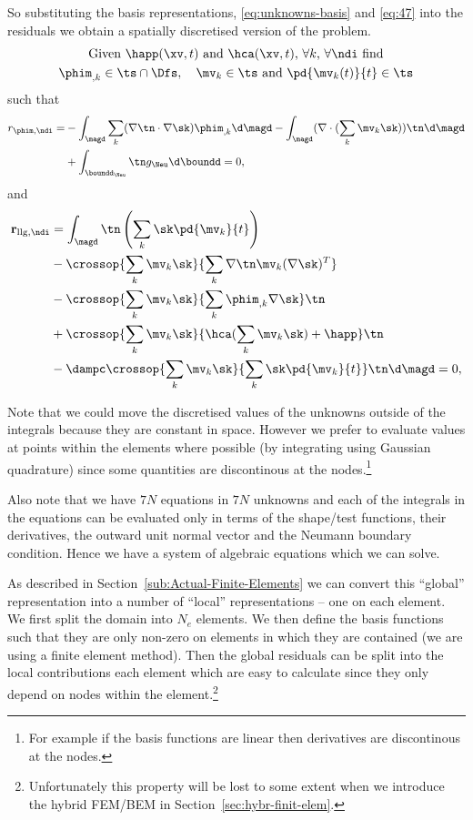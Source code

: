 So substituting the basis representations, \eqref{eq:unknowns-basis} and \eqref{eq:47} into the residuals we obtain a spatially discretised version of the problem.
\begin{gather}
  \label{res:tintro}
  \text{Given $\happ(\xv,t)$ and $\hca(\xv,t)$, $\forall k$, $\forall \ndi$ find} \notag \\
  \phim_{,k} \in \ts \cap \Dfs, \quad
  \mv_{k} \in \ts \text{ and }
  \pd{\mv_k(t)}{t} \in \ts \notag
\end{gather}
such that
\begin{align}
  r_{\phim, \ndi} =
  & - \int_{\magd} \sum_k (\nabla \tn \cdot \nabla \sk) \phim_{,k} \d \magd \notag
  - \int_{\magd} (\nabla \cdot (\sum_k \mv_k \sk) ) \tn \d \magd \\
  & + \int_{\boundd_{\Neu}} \tn g_\Neu \d \boundd = 0,
  \label{res:tphi}
\end{align}
and
\begin{align*}
  \mathbf{r}_{\text{llg},\ndi} &=
  \int_{\magd} \tn \left(\sum_k \sk \pd{\mv_k}{t} \right)
  \\
  &- \crossop{\sum_k \mv_k \sk}{\sum_k \nabla \tn \mv_k (\nabla \sk)^T}
  \\
  &- \crossop{\sum_k \mv_k \sk}{\sum_k \phim_{,k} \nabla \sk} \tn
  \\
  &+ \crossop{\sum_k \mv_k \sk}{\hca(\sum_k \mv_k \sk) + \happ} \tn
  \\
  &- \dampc \crossop{\sum_k \mv_k \sk} {\sum_k \sk \pd{\mv_k}{t}} \tn \d \magd = 0,
\end{align*}


Note that we could move the discretised values of the unknowns outside of the integrals because they are constant in space. However we prefer to evaluate values at points within the elements where possible (by integrating using Gaussian quadrature) since some quantities are discontinous at the nodes.\footnote{For example if the basis functions are linear then derivatives are discontinous at the nodes.}

Also note that we have $7N$ equations in $7N$ unknowns and each of the integrals in the equations can be evaluated only in terms of the shape/test functions, their derivatives, the outward unit normal vector and the Neumann boundary condition. Hence we have a system of algebraic equations which we can solve.

As described in Section~\ref{sub:Actual-Finite-Elements} we can convert this ``global'' representation into a number of ``local'' representations -- one on each element. We first split the domain into $N_e$ elements. We then define the basis functions such that they are only non-zero on elements in which they are contained (\ie we are using a finite element method). Then the global residuals can be split into the local contributions each element which are easy to calculate since they only depend on nodes within the element.\footnote{Unfortunately this property will be lost to some extent when we introduce the hybrid FEM/BEM in Section~\ref{sec:hybr-finit-elem}.}

